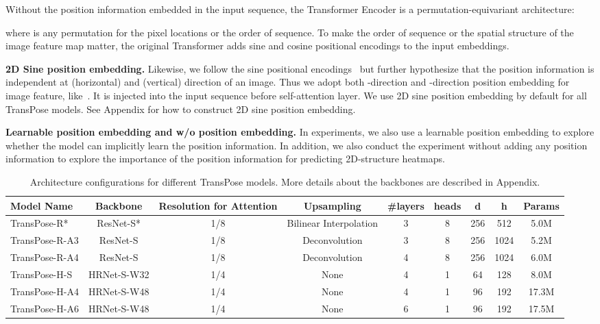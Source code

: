 \documentclass{article}
\begin{document}
Without the position information embedded in the input sequence, the Transformer Encoder is a permutation-equivariant architecture:

where  is any permutation for the pixel locations or the order of sequence. To make the order of sequence or the spatial structure of the image feature map matter, the original Transformer adds sine and cosine positional encodings to the input embeddings.

{\bf 2D Sine position embedding.}  Likewise, we follow the sine positional encodings~\cite{vaswani2017attention} but further hypothesize that the position information is independent at  (horizontal) and  (vertical) direction of an image. Thus we adopt both -direction and -direction position embedding for image feature, like~\cite{parmar2018image,carion2020detr}. It is injected into the input sequence before self-attention layer. We use 2D sine position embedding by default for all TransPose models. See Appendix for how to construct 2D sine position embedding.

{\bf Learnable position embedding and w/o position embedding.} In experiments, we also use a learnable position embedding  to explore whether the model can implicitly learn the position information. In addition, we also conduct the experiment without adding any position information to explore the importance of the position information for predicting 2D-structure heatmaps.
\begin{table*}\scriptsize 
 	\begin{center}
 		\renewcommand{\arraystretch}{1}
 		\setlength{\tabcolsep}{0.3mm}
 		\begin{tabular}{l|ccc|cccc|c}
 			\toprule
 			Model Name & Backbone & Resolution for Attention & Upsampling  &\#layers &heads& d & h & Params \\
 			\midrule
 			TransPose-R* &  ResNet-S*  & 1/8 &  Bilinear Interpolation &3 & 8 & 256 & 512 &5.0M \\
 			TransPose-R-A3 &  ResNet-S  & 1/8 &Deconvolution &3 & 8 & 256 & 1024 &5.2M \\
 			TransPose-R-A4 &  ResNet-S  & 1/8 &Deconvolution &4 & 8 & 256 & 1024 &6.0M \\
 			
 			TransPose-H-S &  HRNet-S-W32  & 1/4 & None& 4& 1 & 64 & 128    & 8.0M \\
 			TransPose-H-A4 &  HRNet-S-W48   & 1/4 &None& 4& 1 & 96 & 192    & 17.3M \\
TransPose-H-A6 &  HRNet-S-W48   & 1/4 &None& 6& 1 & 96 & 192    & 17.5M \\	
 			\bottomrule
 		\end{tabular}
 	\end{center}
 	\caption{Architecture configurations for different TransPose models. More details about the backbones are described in Appendix.}
 	\label{architecture configurations}
\end{table*}
\end{document}
